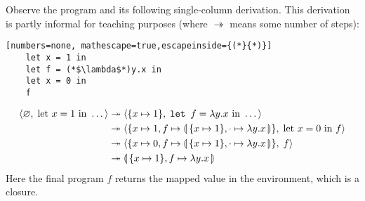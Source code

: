 \begin{Example}

   Observe the program and its following single-column derivation. This derivation is 
   partly informal for teaching purposes (where $\twoheadrightarrow$ means some number of steps):
   \begin{lstlisting}[numbers=none, mathescape=true,escapeinside={(*}{*)}]
    let x = 1 in
    let f = (*$\lambda$*)y.x in
    let x = 0 in
    f
    \end{lstlisting}

    \vspace{-1em}
    \begin{align*}
      \langle\varnothing,\; \text{let } x = 1 \text{ in }  \dots \rangle&\twoheadrightarrow  \langle \{x\mapsto 1\},\; \texttt{let } f = \lambda y.x \text{ in } \dots \rangle \\
            &\twoheadrightarrow \langle \{x\mapsto 1, f\mapsto \llparenthesis\,\{x\mapsto 1\},\cdot\mapsto\lambda y.x\,\rrparenthesis\},\; \text{let } x = 0 \text{ in } f \rangle \\
            &\twoheadrightarrow \langle \{x\mapsto 0, f\mapsto \llparenthesis\,\{x\mapsto 1\},\cdot\mapsto\lambda y.x\,\rrparenthesis\},\; f \rangle \\
            &\twoheadrightarrow \llparenthesis\, \{x\mapsto 1\},f\mapsto\lambda y.x\,\rrparenthesis\\
    \end{align*}
    \noindent
    Here the final program $f$ returns the mapped value in the environment, which is a closure.
  \end{Example}

